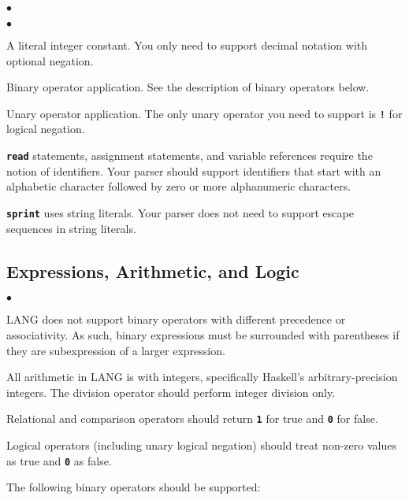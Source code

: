 \documentclass[12pt]{article}
\newcommand\code[1]{\texttt{\textbf{#1}}}
\newenvironment{notelist}{\begin{list}
   {$\bullet$}
   {\setlength{\itemsep}{0in}}}
   {\end{list}}
\begin{document}
\begin{notelist}
\begin{notelist}
            \item A literal integer constant. You only need to support decimal notation with optional negation.
            \item Binary operator application. See the description of binary operators below.
            \item Unary operator application. The only unary operator you need to support is \code{!} for logical negation.
        \end{notelist}
    \item \code{read} statements, assignment statements, and variable references require the notion of identifiers. Your
          parser should support identifiers that start with an alphabetic character followed by zero or more alphanumeric
          characters.
    \item \code{sprint} uses string literals. Your parser does not need to support escape sequences in string literals.
\end{notelist}

\subsection{Expressions, Arithmetic, and Logic}

\begin{notelist}
    \item LANG does not support binary operators with different precedence or associativity. As such, binary expressions must
          be surrounded with parentheses if they are subexpression of a larger expression.
    \item All arithmetic in LANG is with integers, specifically Haskell's arbitrary-precision integers. The division operator
          should perform integer division only.
    \item Relational and comparison operators should return \code{1} for true and \code{0} for false.
    \item Logical operators (including unary logical negation) should treat non-zero values as true and \code{0} as false.
\end{notelist}

The following binary operators should be supported:
\end{document}
